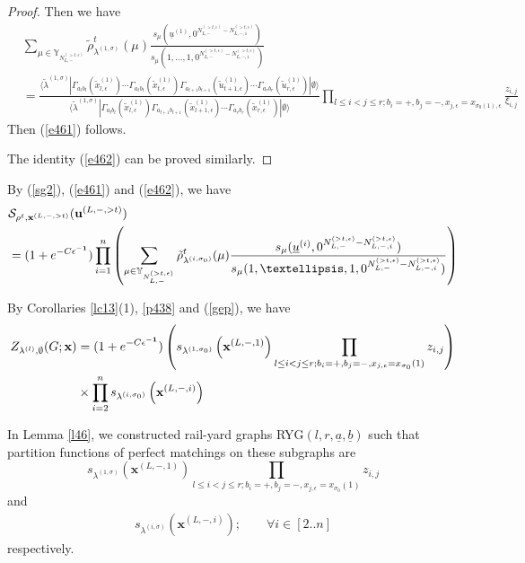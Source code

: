 \documentclass[11pt]{amsart}
\theoremstyle{plain}
\theoremstyle{definition}
\theoremstyle{remark}
\newcommand\si{\sigma}
\newcommand\YY{\mathbb{Y}}
\numberwithin{equation}{section}
\numberwithin{theorem}{section}
\numberwithin{figure}{section}
\begin{document}
\begin{proof}
Then we have
\begin{align*}
&\sum_{\mu\in \YY_{N_{L,-}^{(>t,\epsilon)}}}\tilde{\rho}^t_{\lambda^{(1,\si)}}(\mu)
\frac{s_{\mu}(\underline{u}^{(1)},0^{N_{L,-}^{(>t,\epsilon)}-N_{L,-,1}^{(>t,\epsilon)}})}{s_{\mu}(1,\ldots,1,0^{N_{L,-}^{(>t,\epsilon)}-N_{L,-,1}^{(>t,\epsilon)}})}\\
&=\frac{\langle\tilde{\lambda}^{(1,\sigma)}| \Gamma_{a_lb_l}(\tilde{x}_{l,\epsilon}^{(1)})\cdots \Gamma_{a_tb_t}(\tilde{x}_{t,\epsilon}^{(1)})
\Gamma_{a_{t+1}b_{t+1}}(\tilde{u}_{t+1,\epsilon}^{(1)})\cdots \Gamma_{a_rb_r}(\tilde{u}_{r,\epsilon}^{(1)})
|\emptyset \rangle}{\langle\tilde{\lambda}^{(1,\sigma)}| \Gamma_{a_lb_l}(\tilde{x}_{l,\epsilon}^{(1)})\Gamma_{a_{l+1}b_{l+1}}(\tilde{x}_{l+1,\epsilon}^{(1)})\cdots \Gamma_{a_rb_r}(\tilde{x}_{r,\epsilon}^{(1)})|\emptyset \rangle}\prod_{l\leq i<j\leq r;b_i=+,b_j=-,x_{j,\epsilon}=x_{\sigma_0(1),\epsilon}}\frac{z_{i,j}}{\xi_{i,j}}
\end{align*}
Then (\ref{e461}) follows.

The identity (\ref{e462}) can be proved similarly.
\end{proof}

By (\ref{sg2}), (\ref{e461}) and (\ref{e462}), we have
\begin{align}
&\mathcal{S}_{\rho^t,\mathbf{x}^{(L,-,> t)}}(\mathbf{u}^{(L,-,> t)})\label{sg1}\\
&=(1+e^{-C\mathbf{\epsilon^{-1}}})
\prod_{i=1}^{n}\left(\sum_{\mu\in\YY_{N_{L,-}^{(>t,\epsilon)}}}\tilde{\rho}^{t}_{\lambda^{(i,\si_0)}}(\mu)\frac{s_{\mu}(\underline{u}^{(i)},0^{N_{L,-}^{(>t,\epsilon)}-N_{L,-,i}^{(>t,\epsilon)}})}{s_{\mu}(1,\ldots,1,0^{N_{L,-}^{(>t,\epsilon)}-N_{L,-,i}^{(>t,\epsilon)}})}\right)\notag
\end{align}

By Corollaries \ref{lc13}(1), \ref{p438} and (\ref{gep}), we have
\begin{align}
\label{pt}Z_{\lambda^{(l)},\emptyset}(G;\mathbf{x})
&=(1+e^{-C\mathbf{\epsilon^{-1}}})
\left(s_{\lambda^{(1,\sigma_0)}}\left(\mathbf{x}^{(L,-,1)}\right)\prod_{l\leq i<j\leq r;b_i=+,b_j=-,x_{j,\epsilon}=x_{\si_0}(1)}z_{i,j}\right)\\
&\times\prod_{i=2}^{n}
s_{\lambda^{(i,\sigma_0)}}\left(\mathbf{x}^{(L,-,i)}\right)\notag
\end{align}

In Lemma \ref{l46}, we constructed rail-yard graphs RYG$(l,r,\underline{a},\underline{b})$ such that partition functions of perfect matchings on these subgraphs are 
\begin{equation}
s_{\lambda^{(1,\sigma)}}\left(\mathbf{x}^{(L,-,1)}\right)\prod_{l\leq i<j\leq r;b_i=+,b_j=-,x_{j,\epsilon}=x_{\si_0}(1)}z_{i,j}\label{si1}
\end{equation}
and 
\begin{align}
s_{\lambda^{(i,\sigma)}}\left(\mathbf{x}^{(L,-,i)}\right);\qquad \forall i\in[2..n]\label{si2n}
\end{align}
respectively.
\end{document}
